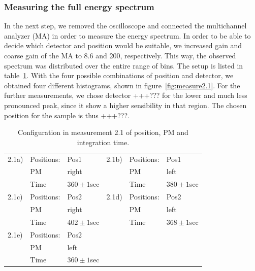 \subsubsection{Measuring the full energy spectrum}
\label{ssub:Measuring the full energy spectrum}
In the next step, we removed the oscilloscope and connected the multichannel analyzer (MA)
in order to measure the energy spectrum. In order to be able to decide which detector and position would
be suitable, we increased gain and coarse gain of the MA to 8.6 and 200, respectively.
This way, the observed spectrum was distributed over the entire range of bins. 
The setup is listed in table~\ref{tab:config2}. With the four possible combinations
of position and detector, we obtained four different histograms, shown in figure~\ref{fig:measure2.1}.
For the further measurements, we chose detector +++??? for the lower and much less 
pronounced peak, since it show a higher sensibility in that region. The 
chosen position for the sample is thus +++???.
\begin{table}[htp]
    \begin{tabular}{|l|l|l||l|l|l|}
        \hline
        2.1a) & Positions:  & Pos1         & 2.1b) & Positions:  & Pos1\\
              & PM          & right        &       & PM          & left \\
              & Time        & $360\pm1$sec &       & Time        & $380\pm1$sec \\
        \hline 
        2.1c) & Positions:  & Pos2         & 2.1d) & Positions:  & Pos2         \\
              & PM          & right        &       & PM          & left \\
              & Time        & $402\pm1$sec &       & Time        & $368\pm1$sec \\
        \hline 
        2.1e) & Positions:  & Pos2         \\
              & PM          & left \\
              & Time        & $360\pm1$sec \\
    \cline{1-3}
    \end{tabular}
  \caption{Configuration in measurement 2.1 of position, PM and integration time.}
    \label{tab:config2}
\end{table}

